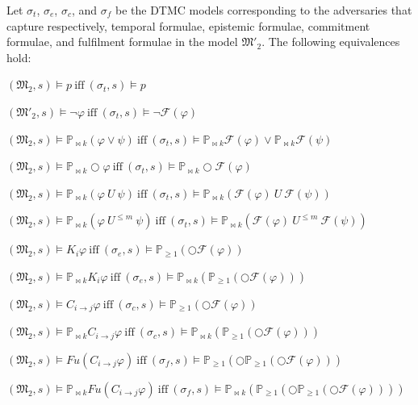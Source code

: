 \begin{theorem}\label{Satsisfaction-Equivelance}\hspace{0.5cm}

Let $\sigma_{t}$, $\sigma_{e}$, $\sigma_{c}$, and $\sigma_f$ be the DTMC models corresponding to the adversaries that capture respectively, temporal formulae, epistemic formulae, commitment formulae, and fulfilment formulae in the model $\mathfrak{M'_2}$. The following equivalences hold:

$(\mathfrak{M_2},s)\models p ~\text{iff}~ (\sigma_t,s) \models p$

$(\mathfrak{M'_2},s)\models \neg \varphi ~\text{iff}~ (\sigma_t,s)\models\neg \mathscr{F}(\varphi)$

$(\mathfrak{M_2},s)\models \mathbb{P}_{\bowtie k}(\varphi \vee \psi)
~\text{iff}~ (\sigma_t,s) \models
\mathbb{P}_{\bowtie k} \mathscr{F}(\varphi) \vee
\mathbb{P}_{\bowtie k} \mathscr{F}(\psi) $

$(\mathfrak{M_2},s)\models \mathbb{P}_{\bowtie k}\bigcirc\varphi ~\text{iff}~ (\sigma_t,s) \models\mathbb{P}_{\bowtie k} \bigcirc \mathscr{F}(\varphi) $

$(\mathfrak{M_2},s)\models\mathbb{P}_{\bowtie k}(\varphi~ U ~ \psi) ~\text{iff}~ (\sigma_t,s) \models \mathbb{P}_{\bowtie k}(\mathscr{F}(\varphi)~ U ~\mathscr{F}(\psi))$

$(\mathfrak{M_2},s)\models\mathbb{P}_{\bowtie k}(\varphi~ U^{\leq m} ~ \psi) ~\text{iff}~ (\sigma_t,s) \models \mathbb{P}_{\bowtie k}(\mathscr{F}(\varphi)~ U^{\leq m} ~\mathscr{F}(\psi))$

$(\mathfrak{M_2},s)\models K_i \varphi ~\text{iff}~ (\sigma_e,s)\models \mathbb{P}_{\geq1}(\bigcirc\mathscr{F}(\varphi))$

$(\mathfrak{M_2},s)\models \mathbb{P}_{\bowtie k}K_i \varphi ~\text{iff}~ (\sigma_e,s) \models \mathbb{P}_{\bowtie k}(\mathbb{P}_{\geq1}(\bigcirc\mathscr{F}(\varphi)))$

$(\mathfrak{M_2},s)\models C_{i \rightarrow j}\varphi ~\text{iff}~ (\sigma_c,s)\models \mathbb{P}_{\geq1}(\bigcirc\mathscr{F}(\varphi))$

$(\mathfrak{M_2},s)\models \mathbb{P}_{\bowtie k}C_{i \rightarrow j}\varphi ~\text{iff}~ (\sigma_c,s) \models \mathbb{P}_{\bowtie k}(\mathbb{P}_{\geq1}(\bigcirc\mathscr{F}(\varphi)))$

$(\mathfrak{M_2},s)\models Fu(C_{i \rightarrow j}\varphi) ~\text{iff}~ (\sigma_f,s) \models \mathbb{P}_{\geq 1}(\bigcirc\mathbb{P}_{\geq 1}(\bigcirc \mathscr{F}(\varphi)))$

$(\mathfrak{M_2},s)\models \mathbb{P}_{\bowtie k}Fu(C_{i \rightarrow j}\varphi) ~\text{iff}~ (\sigma_f,s) \models \mathbb{P}_{\bowtie k} (\mathbb{P}_{\geq 1}(\bigcirc\mathbb{P}_{\geq 1}(\bigcirc \mathscr{F}(\varphi))))$

\end{theorem}


